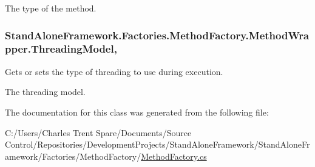 The type of the method.\hypertarget{class_stand_alone_framework_1_1_factories_1_1_method_factory_1_1_method_wrapper_ad81cf5c2f772eea08b0f64ea0032d44b}{
\subsubsection[{Threading\+Model}]{ Stand\+Alone\+Framework.\+Factories.\+Method\+Factory.\+Method\+Wrapper.\+Threading\+Model\hspace{0.3cm}{\ttfamily [get]}, {\ttfamily [set]}}}\label{class_stand_alone_framework_1_1_factories_1_1_method_factory_1_1_method_wrapper_ad81cf5c2f772eea08b0f64ea0032d44b}


Gets or sets the type of threading to use during execution. 

The threading model.

The documentation for this class was generated from the following file\+:\begin{DoxyCompactItemize}
\item 
C\+:/\+Users/\+Charles Trent Spare/\+Documents/\+Source Control/\+Repositories/\+Development\+Projects/\+Stand\+Alone\+Framework/\+Stand\+Alone\+Framework/\+Factories/\+Method\+Factory/\hyperlink{_method_factory_8cs}{Method\+Factory.\+cs}\end{DoxyCompactItemize}
